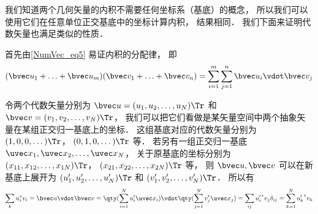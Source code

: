 我们知道两个几何矢量的内积不需要任何坐标系（基底）的概念， 所以我们可以使用它们在任意单位正交基底中的坐标计算内积， 结果相同． 我们下面来证明代数矢量也满足类似的性质．

首先由\autoref{NumVec_eq5} 易证内积的分配律， 即
\begin{equation}
(\bvec u_1 + \ldots + \bvec u_m)(\bvec v_1 + \ldots + \bvec v_n) = \sum_{i=1}^m \sum_{j=1}^n \bvec u_i \vdot \bvec v_j
\end{equation}

令两个代数矢量分别为 $\bvec u = (u_1, u_2, \dots, u_N)\Tr$ 和 $\bvec v = (v_1, v_2, \dots, v_N)\Tr$， 我们可以把它们看做是某矢量空间中两个抽象矢量在某组正交归一基底上的坐标． 这组基底对应的代数矢量分别为 $(1, 0, 0, \dots)\Tr$， $(0, 1, 0, \dots)\Tr$ 等． 若另有一组正交归一基底 $\uvec x_1, \uvec x_2, \dots, \uvec x_N$， 关于原基底的坐标分别为 $(x_{11}, x_{12}, \dots, x_{1N})\Tr$， $(x_{21}, x_{22}, \dots, x_{2N})\Tr$ 等， 则 $\bvec u, \bvec v$ 可以在新基底上展开为 $(u'_1, u'_2, \dots, u'_N)\Tr$ 和 $(v'_1, v'_2, \dots, v'_N)\Tr$． 所以有
\begin{equation}
\sum_k u_i^* v_i = \bvec u \vdot \bvec v = \qty(\sum_{i=1}^N u'_i \uvec x_i)\vdot\qty(\sum_{j=1}^N v'_j \uvec x_j) = \sum_{ij} {u'_i}^* v_j \delta_{ij} = \sum_{k=1}^N {u'_k}^* v_k
\end{equation}







